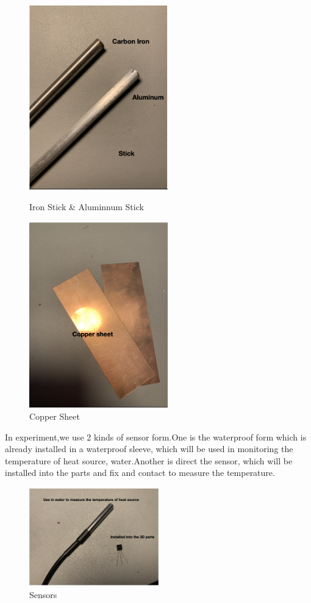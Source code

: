 \documentclass[12pt]{article}
\numberwithin{equation}{section}
\begin{document}
\begin{figure}[htbp]
\centering
\begin{minipage}[t]{0.48\textwidth}
\centering
\includegraphics[width=6cm]{stick.png}
\caption{Iron Stick \& Aluminnum Stick}
\label{Stick}
\end{minipage}
\begin{minipage}[t]{0.48\textwidth}
\centering
\includegraphics[width=6cm]{sheet.png}
\caption{Copper Sheet}
\label{Sheet}
\end{minipage}
\end{figure}

In experiment,we use 2 kinds of sensor form.One is the waterproof form which is already installed in a waterproof sleeve, which will be used in monitoring the temperature of heat source, water.Another is direct the sensor, which will be installed into the parts and fix and contact to measure the temperature.

\begin{figure}[H]%
\centering %
\includegraphics[width=0.5\textwidth]{sensor.png} %
\caption{Sensors} %
\end{figure} 
\end{document}
